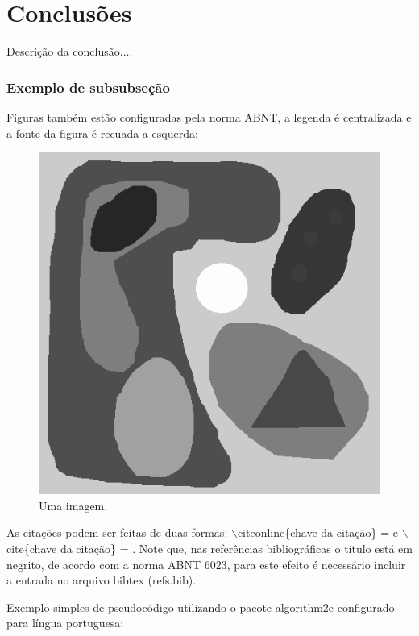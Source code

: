 \documentclass[courier]{uninove-ppgi}
\begin{document}
		\section{Conclusões}
		
		 Descrição da conclusão....
     
    \subsubsection{Exemplo de subsubseção}
    
    Figuras também estão configuradas pela norma ABNT, a legenda é centralizada e a fonte da figura é recuada a esquerda:
    
    \begin{figure}[ht!]
    
    	\begin{center}
    	
    		\includegraphics[scale=0.4]{leveling1}
    	
    	\end{center}
    	
    	\caption{Uma imagem.}
    	
    	
    \end{figure}
    
    As citações podem ser feitas de duas formas: {\color{red}$\backslash$citeonline}\{chave da citação\} =  e {\color{red}$\backslash$cite}\{chave da citação\} = \cite{seymor:book:1971}. Note que, nas referências bibliográficas o título está em negrito, de acordo com a norma ABNT 6023, para este efeito é necessário incluir a entrada no arquivo bibtex (refs.bib).
    
    Exemplo simples de pseudocódigo utilizando o pacote {\color{red}algorithm2e} configurado para língua portuguesa:
    
    
    
    
    		   
    
\end{document}
